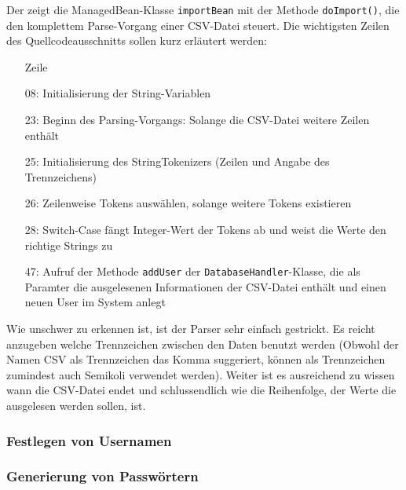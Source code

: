 Der  zeigt die ManagedBean-Klasse \texttt{importBean} mit der Methode \texttt{doImport()}, die den komplettem Parse-Vorgang einer CSV-Datei steuert.
Die wichtigsten Zeilen des Quellcodeausschnitts sollen kurz erläutert werden:
\begin{itemize}
  \item[Zeile]
  \item[08:] Initialisierung der String-Variablen
  \item[23:] Beginn des Parsing-Vorgangs: Solange die CSV-Datei weitere Zeilen enthält
  \item[25:] Initialisierung des StringTokenizers (Zeilen und Angabe des Trennzeichens)
  \item[26:] Zeilenweise Tokens auswählen, solange weitere Tokens existieren
  \item[28:] Switch-Case fängt Integer-Wert der Tokens ab und weist die Werte den richtige Strings zu
  \item[47:] Aufruf der Methode \texttt{addUser} der \texttt{DatabaseHandler}-Klasse, die als Paramter die ausgelesenen Informationen der CSV-Datei enthält und einen neuen User im System anlegt
\end{itemize}

Wie unschwer zu erkennen ist, ist der Parser sehr einfach gestrickt. Es reicht anzugeben welche Trennzeichen zwischen den Daten benutzt werden (Obwohl der Namen CSV als Trennzeichen das Komma suggeriert, können als Trennzeichen zumindest auch Semikoli verwendet werden).
Weiter ist es ausreichend zu wissen wann die CSV-Datei endet und schlussendlich wie die Reihenfolge, der Werte die ausgelesen werden sollen, ist.

	

\subsubsection{Festlegen von Usernamen}

\subsubsection{Generierung von Passwörtern}


